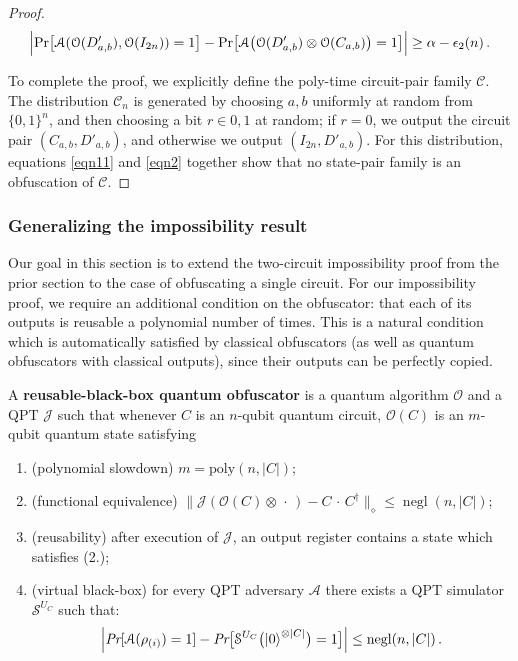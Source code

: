 \documentclass[envcountsame]{llncs}
\numberwithin{equation}{section}
\newcommand{\opn}{\operatorname}
\newcommand{\algo}{\mathcal}
\newcommand{\negl}{\opn{negl}}
\begin{document}
\begin{proof}
\begin{equation}\label{eqn2}
\Bigl| \text{Pr}\bigl[\mathcal A(\mathcal{O}(D'_{a,b}),\mathcal{O}(I_{2n})) = 1\bigr]
- \text{Pr}\bigl[\mathcal A\bigl(\mathcal{O}(D'_{a,b})\otimes\mathcal{O}(C_{a,b})\bigr) = 1\bigr] \Bigr| 
\geq \alpha-\epsilon_2(n)\,.
\end{equation}

To complete the proof, we explicitly define the poly-time circuit-pair family $\mathcal C$. The distribution $\mathcal C_n$ is generated by choosing $a, b$ uniformly at random from $\{0,1\}^n$, and then choosing a bit $r \in {0, 1}$ at random; if $r = 0$, we output the circuit pair $(C_{a,b}, D'_{a,b})$, and otherwise we output $(I_{2n}, D'_{a,b})$. For this distribution, equations \eqref{eqn11} and \eqref{eqn2} together show that no state-pair family is an obfuscation of $\mathcal C$.
\end{proof}

\subsubsection{Generalizing the impossibility result}

Our goal in this section is to extend the two-circuit impossibility proof from the prior section to the case of obfuscating a single circuit. For our impossibility proof, we require an additional condition on the obfuscator: that each of its outputs is reusable a polynomial number of times. This is a natural condition which is automatically satisfied by classical obfuscators (as well as quantum obfuscators with classical outputs), since their outputs can be perfectly copied.

\begin{definition}\label{def:vbb-reusable}
A \textbf{reusable-black-box quantum obfuscator} is a quantum algorithm $\algo O$ and a QPT $\algo J$ such that whenever $C$ is an $n$-qubit quantum circuit, $\mathcal{O}(C)$ is an $m$-qubit quantum state satisfying
\begin{enumerate}
\item (polynomial slowdown)  $m = \text{poly}(n, |C|)$;
\item (functional equivalence) $\bigl\| \algo J ( \mathcal O(C) \otimes \,\cdot\, ) - C \,\cdot\, C^\dagger \bigr\|_\diamond \leq \negl(n, |C|)$;
\item (reusability) after execution of $\algo J$, an output register contains a state which satisfies (2.);
\item (virtual black-box) for every QPT adversary $\mathcal A$ there exists a QPT simulator $\mathcal S^{U_C}$ such that:
$$
\Bigl| \emph{Pr}[\mathcal A(\rho_{(i)}) = 1] - \emph{Pr}\bigl[\mathcal S^{U_C}\bigl(\ket{0}^{\otimes |C|}\bigr) = 1\bigr] \Bigr| \leq \negl(n, |C|)\,.
$$
\end{enumerate}
\end{definition}
\end{document}
